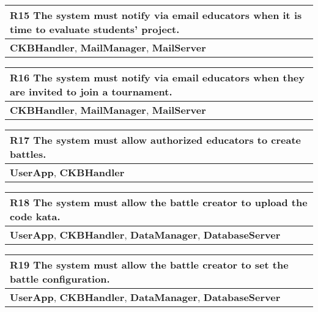\begin{table}[H]
    \begin{tabularx}{\textwidth}{X}
        \toprule
        \textbf{R15} The system must notify via email educators when it is time to evaluate students' project. \\ \midrule
        \textbf{CKBHandler}, \textbf{MailManager}, \textbf{MailServer}     \end{tabularx}
\end{table}

\begin{table}[H]
    \begin{tabularx}{\textwidth}{X}
        \toprule
        \textbf{R16} The system must notify via email educators when they are invited to join a tournament. \\ \midrule
        \textbf{CKBHandler}, \textbf{MailManager}, \textbf{MailServer} \\
    \end{tabularx}
\end{table}

\begin{table}[H]
    \begin{tabularx}{\textwidth}{X}
        \toprule
        \textbf{R17} The system must allow authorized educators to create battles. \\ \midrule
        \textbf{UserApp}, \textbf{CKBHandler}                   \\
    \end{tabularx}
\end{table}

\begin{table}[H]
    \begin{tabularx}{\textwidth}{X}
        \toprule
        \textbf{R18} The system must allow the battle creator to upload the code kata. \\ \midrule
        \textbf{UserApp}, \textbf{CKBHandler}, \textbf{DataManager}, \textbf{DatabaseServer}                    \\
    \end{tabularx}
\end{table}

\begin{table}[H]
    \begin{tabularx}{\textwidth}{X}
        \toprule
        \textbf{R19} The system must allow the battle creator to set the battle configuration. \\ \midrule
        \textbf{UserApp}, \textbf{CKBHandler}, \textbf{DataManager}, \textbf{DatabaseServer}                    \\
    \end{tabularx}
\end{table}

